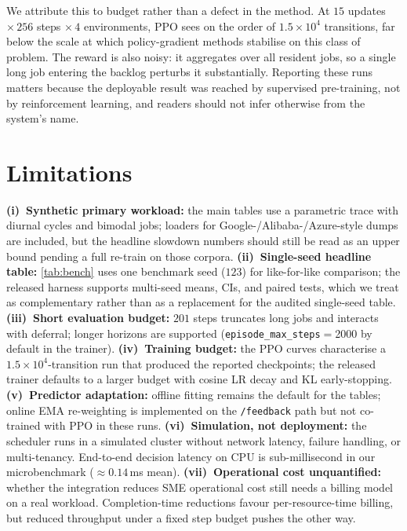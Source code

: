 \documentclass[runningheads]{llncs}
\begin{document}
We attribute this to budget rather than a defect in the method. At
$15$ updates $\times\,256$ steps $\times\,4$ environments, PPO sees on
the order of $1.5\times10^4$ transitions, far below the scale at which
policy-gradient methods stabilise on this class of problem. The reward
is also noisy: it aggregates over all resident jobs, so a single long
job entering the backlog perturbs it substantially. Reporting these
runs matters because the deployable result was reached by supervised
pre-training, not by reinforcement learning, and readers should not
infer otherwise from the system's name.

\section{Limitations}\label{sec:limitations}
\textbf{(i)~Synthetic primary workload:} the main tables use a
parametric trace with diurnal cycles and bimodal jobs; loaders for
Google-/Alibaba-/Azure-style dumps are included, but the headline
slowdown numbers should still be read as an upper bound pending a full
re-train on those corpora.
\textbf{(ii)~Single-seed headline table:} \cref{tab:bench} uses one
benchmark seed ($123$) for like-for-like comparison; the released
harness supports multi-seed means, CIs, and paired tests, which we
treat as complementary rather than as a replacement for the audited
single-seed table.
\textbf{(iii)~Short evaluation budget:} $201$ steps truncates long jobs
and interacts with deferral; longer horizons are supported
(\texttt{episode\_max\_steps}${}={}$2000 by default in the trainer).
\textbf{(iv)~Training budget:} the PPO curves characterise a
$1.5\times10^4$-transition run that produced the reported checkpoints;
the released trainer defaults to a larger budget with cosine LR decay
and KL early-stopping.
\textbf{(v)~Predictor adaptation:} offline fitting remains the default
for the tables; online EMA re-weighting is implemented on the
\texttt{/feedback} path but not co-trained with PPO in these runs.
\textbf{(vi)~Simulation, not deployment:} the scheduler runs in a
simulated cluster without network latency, failure handling, or
multi-tenancy. End-to-end decision latency on CPU is sub-millisecond in
our microbenchmark ($\approx0.14$\,ms mean).
\textbf{(vii)~Operational cost unquantified:} whether the integration
reduces SME operational cost still needs a billing model on a real
workload. Completion-time reductions favour per-resource-time billing,
but reduced throughput under a fixed step budget pushes the other way.
\end{document}

